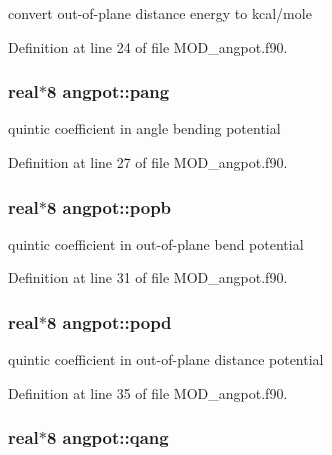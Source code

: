 convert out-\/of-\/plane distance energy to kcal/mole 



Definition at line 24 of file M\-O\-D\-\_\-angpot.\-f90.

\hypertarget{classangpot_ad45418268664a5204167270a85a0bf86}{
\subsubsection[{pang}]{\setlength{\rightskip}{0pt plus 5cm}real$\ast$8 angpot\-::pang}}\label{classangpot_ad45418268664a5204167270a85a0bf86}


quintic coefficient in angle bending potential 



Definition at line 27 of file M\-O\-D\-\_\-angpot.\-f90.

\hypertarget{classangpot_a66f43101158f734ab9c9ded47d17bb45}{
\subsubsection[{popb}]{\setlength{\rightskip}{0pt plus 5cm}real$\ast$8 angpot\-::popb}}\label{classangpot_a66f43101158f734ab9c9ded47d17bb45}


quintic coefficient in out-\/of-\/plane bend potential 



Definition at line 31 of file M\-O\-D\-\_\-angpot.\-f90.

\hypertarget{classangpot_a924ee1ac145c598a491ee414b7434ab4}{
\subsubsection[{popd}]{\setlength{\rightskip}{0pt plus 5cm}real$\ast$8 angpot\-::popd}}\label{classangpot_a924ee1ac145c598a491ee414b7434ab4}


quintic coefficient in out-\/of-\/plane distance potential 



Definition at line 35 of file M\-O\-D\-\_\-angpot.\-f90.

\hypertarget{classangpot_a1022deb1628dafe61ac691b539fb2c61}{
\subsubsection[{qang}]{\setlength{\rightskip}{0pt plus 5cm}real$\ast$8 angpot\-::qang}}\label{classangpot_a1022deb1628dafe61ac691b539fb2c61}


